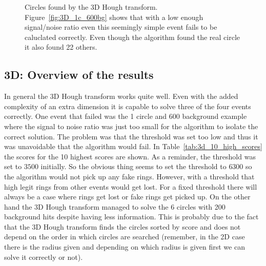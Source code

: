\documentclass[11pt]{scrreprt}
\begin{document}
\begin{figure}[htp]
        \centering

        \caption[Circles found by the 3D Hough transform]{Circles found by the 3D Hough transform. Figure~\ref{fig:3D_1c_600bg} shows that with a low enough signal/noise ratio even this seemingly simple event fails to be caluclated correctly. Even though the algorithm found the real circle it also found 22 others.\label{fig:3D_HT_results}}
\end{figure}


\subsection{3D: Overview of the results} %
\label{ssub:3d_overview_of_the_results}

In general the 3D Hough transform works quite well. Even with the added complexity of an extra dimension it is capable to solve three of
the four events correctly. One event that failed was the 1 circle and 600 background example where the signal to noise ratio was just 
too small for the algorithm to isolate the correct solution. The problem was that the threshold was set too low and thus it was unavoidable
that the algorithm would fail. In Table~\ref{tab:3d_10_high_scores} the scores for the 10 highest scores are shown. As a reminder, the threshold
was set to $3500$ initially. So the obvious thing seems to set the threshold to $6300$ so the algorithm would not pick up any fake rings.
However, with a threshold that high legit rings from other events would get lost. For a fixed threshold there will always be a case where rings get
lost or fake rings get picked up. 
On the other hand the 3D Hough transform managed to solve the 6 circles with 200 background hits despite having less information. 
This is probably due to the fact that the 3D Hough transform finds the circles sorted by score and does not depend on the order in 
which circles are searched (remember, in the 2D case there is the radius given and depending on which radius is given first we can 
solve it correctly or not).
\end{document}
